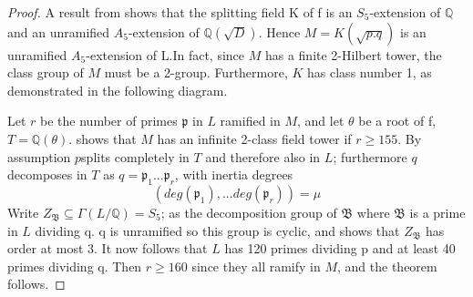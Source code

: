 \documentclass[12pt]{extarticle}
\newcommand{\Q}{\mathbb{Q}}
\newcommand{\<}{\langle}
\renewcommand{\>}{\rangle}
\theoremstyle{definition}
\begin{document}
\begin{proof}
A result from \cite{KOND} shows that the splitting field K
of f is an $S_5$-extension of $\mathbb{Q}$ and an unramified $A_5$-extension of $\mathbb{Q}(\sqrt{D})$. Hence $M=K(\sqrt{p.q})$ is an
unramified $A_5$-extension of L.In fact, since $M$ has a finite 2-Hilbert tower, the class group of $M$ must be a 2-group.  Furthermore, $K$ has class number 1, as demonstrated in the following diagram.
\begin{center}
\end{center}

Let $r$ be the number of primes $\mathfrak{p}$ in $L$ ramified in $M$, and let $\theta$ be a root of f, $T = \mathbb{Q}(\theta)$. \cite{MART1978} shows that $M$ has an infinite 2-class field tower if $r\geq 155$. By assumption $p$splits completely in $T$ and therefore also in $L$; furthermore $q$ decomposes in $T$ as $q = \mathfrak{p}_1...\mathfrak{p}_r$, with inertia degrees
\begin{equation}
    (deg(\mathfrak{p}_1),...deg(\mathfrak{p}_r))=\mu 
\end{equation}
Write $Z_\mathfrak{B}\subseteq\Gamma(L/\Q) = S_5$; as the decomposition group of $\mathfrak{B}$ where $\mathfrak{B}$ is a prime in $L$ dividing q. q is unramified so this group is cyclic, and \cite{MART1978} shows that $Z_\mathfrak{B}$ has order at most 3.  It now follows that $L$ has 120 primes dividing p and at least 40 primes dividing q. Then $r\geq 160$ since they all ramify in $M$, and the theorem follows.
\end{proof}
\end{document}
